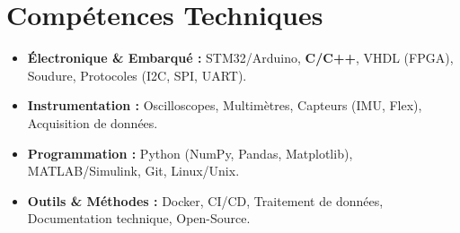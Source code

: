 \documentclass[a4paper,11pt]{article}
\begin{document}
\section{Compétences Techniques}
\begin{itemize}[leftmargin=*, nosep]
    \item \small{\textbf{Électronique \& Embarqué :} STM32/Arduino, \textbf{C/C++}, VHDL (FPGA), Soudure, Protocoles (I2C, SPI, UART).}
    \item \small{\textbf{Instrumentation :} Oscilloscopes, Multimètres, Capteurs (IMU, Flex), Acquisition de données.}
    \item \small{\textbf{Programmation :} Python (NumPy, Pandas, Matplotlib), MATLAB/Simulink, Git, Linux/Unix.}
    \item \small{\textbf{Outils \& Méthodes :} Docker, CI/CD, Traitement de données, Documentation technique, Open-Source.}
\end{itemize}

\end{document}
